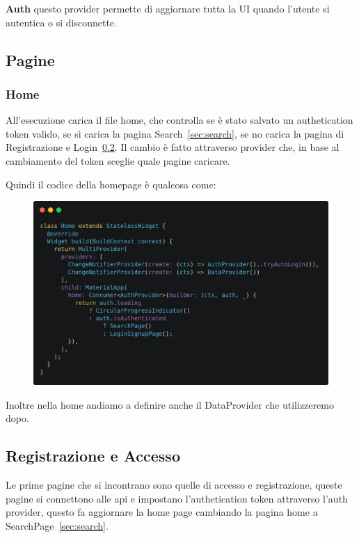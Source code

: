 \documentclass[a4paper,12pt]{article}
\begin{document}
\textbf{Auth} questo provider permette di aggiornare tutta la UI quando l'utente si autentica o si disconnette.

\newpage

\subsection{Pagine}

\subsubsection{Home}


All'esecuzione carica il file home, che controlla se è stato salvato un authetication token valido, se sì carica la pagina Search~\ref{sec:search}, se no carica la pagina di Registrazione e Login~\ref{sec:login}. Il cambio è fatto attraverso provider che, in base al cambiamento del token sceglie quale pagine caricare.

Quindi il codice della homepage è qualcosa come:

\begin{figure}[h]
    \centering
        \includegraphics[width=0.9\linewidth]{img/home.png}
\end{figure}


Inoltre nella home andiamo a definire anche il DataProvider che utilizzeremo dopo.

\newpage

\subsection{Registrazione e Accesso}
\label{sec:login}

Le prime pagine che si incontrano sono quelle di accesso e registrazione, queste pagine si connettono alle api e impostano l'authetication token attraverso l'auth provider, questo fa aggiornare la home page cambiando la pagina home a SearchPage~\ref{sec:search}.
\end{document}
